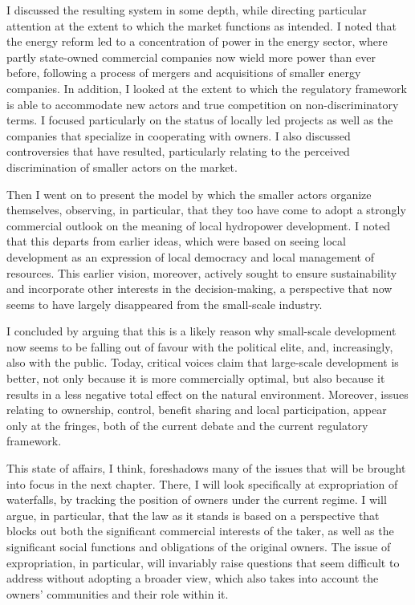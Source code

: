 I discussed the resulting system in some depth, while directing particular attention at the extent to which the market functions as intended. I noted that the energy reform led to a concentration of power in the energy sector, where partly state-owned commercial companies now wield more power than ever before, following a process of mergers and acquisitions of smaller energy companies. In addition, I looked at the extent to which the regulatory framework is able to accommodate new actors and true competition on non-discriminatory terms. I focused particularly on the status of locally led projects as well as the companies that specialize in cooperating with owners. I also discussed controversies that have resulted, particularly relating to the perceived discrimination of smaller actors on the market.

Then I went on to present the model by which the smaller actors organize themselves, observing, in particular, that they too have come to adopt a strongly commercial outlook on the meaning of local hydropower development. I noted that this departs from earlier ideas, which were based on seeing local development as an expression of local democracy and local management of resources. This earlier vision, moreover, actively sought to ensure sustainability and incorporate other interests in the decision-making, a perspective that now seems to have largely disappeared from the small-scale industry.

I concluded by arguing that this is a likely reason why small-scale development now seems to be falling out of favour with the political elite, and, increasingly, also with the public. Today, critical voices claim that large-scale development is better, not only because it is more commercially optimal, but also because it results in a less negative total effect on the natural environment. Moreover, issues relating to ownership, control, benefit sharing and local participation, appear only at the fringes, both of the current debate and the current regulatory framework. 

This state of affairs, I think, foreshadows many of the issues that will be brought into focus in the next chapter. There, I will look specifically at expropriation of waterfalls, by tracking the position of owners under the current regime. I will argue, in particular, that the law as it stands is based on a perspective that blocks out both the significant commercial interests of the taker, as well as the significant social functions and obligations of the original owners. The issue of expropriation, in particular, will invariably raise questions that seem difficult to address without adopting a broader view, which also takes into account the owners' communities and their role within it.